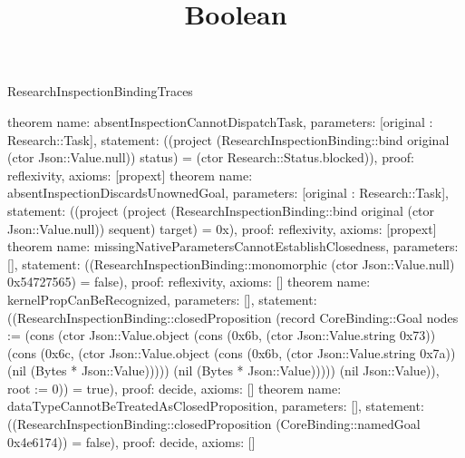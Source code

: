 \begin{lexlean}{ResearchInspectionBindingTraces}
\title{Boolean}
\begin{semanticmodule}
theorem{
 name: absentInspectionCannotDispatchTask,
 parameters: [original : Research::Task],
 statement: ((project (ResearchInspectionBinding::bind original (ctor Json::Value.null)) status) = (ctor Research::Status.blocked)),
 proof: reflexivity{},
 axioms: [propext]
}
theorem{
 name: absentInspectionDiscardsUnownedGoal,
 parameters: [original : Research::Task],
 statement: ((project (project (ResearchInspectionBinding::bind original (ctor Json::Value.null)) sequent) target) = 0x),
 proof: reflexivity{},
 axioms: [propext]
}
theorem{
 name: missingNativeParametersCannotEstablishClosedness,
 parameters: [],
 statement: ((ResearchInspectionBinding::monomorphic (ctor Json::Value.null) 0x54727565) = false),
 proof: reflexivity{},
 axioms: []
}
theorem{
 name: kernelPropCanBeRecognized,
 parameters: [],
 statement: ((ResearchInspectionBinding::closedProposition (record CoreBinding::Goal {nodes := (cons (ctor Json::Value.object (cons (0x6b, (ctor Json::Value.string 0x73)) (cons (0x6c, (ctor Json::Value.object (cons (0x6b, (ctor Json::Value.string 0x7a)) (nil (Bytes * Json::Value))))) (nil (Bytes * Json::Value))))) (nil Json::Value)), root := 0})) = true),
 proof: decide{},
 axioms: []
}
theorem{
 name: dataTypeCannotBeTreatedAsClosedProposition,
 parameters: [],
 statement: ((ResearchInspectionBinding::closedProposition (CoreBinding::namedGoal 0x4e6174)) = false),
 proof: decide{},
 axioms: []
}
\end{semanticmodule}
\end{lexlean}
